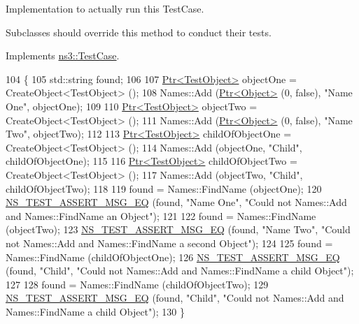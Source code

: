 Implementation to actually run this Test\+Case. 

Subclasses should override this method to conduct their tests. 

Implements \hyperlink{classns3_1_1TestCase_a8ff74680cf017ed42011e4be51917a24}{ns3\+::\+Test\+Case}.


\begin{DoxyCode}
104 \{
105   std::string found;
106 
107   \hyperlink{classns3_1_1Ptr}{Ptr<TestObject>} objectOne = CreateObject<TestObject> ();
108   Names::Add (\hyperlink{classns3_1_1Ptr}{Ptr<Object>} (0, \textcolor{keyword}{false}), \textcolor{stringliteral}{"Name One"}, objectOne);
109 
110   \hyperlink{classns3_1_1Ptr}{Ptr<TestObject>} objectTwo = CreateObject<TestObject> ();
111   Names::Add (\hyperlink{classns3_1_1Ptr}{Ptr<Object>} (0, \textcolor{keyword}{false}), \textcolor{stringliteral}{"Name Two"}, objectTwo);
112 
113   \hyperlink{classns3_1_1Ptr}{Ptr<TestObject>} childOfObjectOne = CreateObject<TestObject> ();
114   Names::Add (objectOne, \textcolor{stringliteral}{"Child"}, childOfObjectOne);
115 
116   \hyperlink{classns3_1_1Ptr}{Ptr<TestObject>} childOfObjectTwo = CreateObject<TestObject> ();
117   Names::Add (objectTwo, \textcolor{stringliteral}{"Child"}, childOfObjectTwo);
118 
119   found = Names::FindName (objectOne);
120   \hyperlink{group__testing_ga2a9d78cffb3db8e867c35fff0b698cf5}{NS\_TEST\_ASSERT\_MSG\_EQ} (found, \textcolor{stringliteral}{"Name One"}, \textcolor{stringliteral}{"Could not Names::Add and Names::FindName
       an Object"});
121 
122   found = Names::FindName (objectTwo);
123   \hyperlink{group__testing_ga2a9d78cffb3db8e867c35fff0b698cf5}{NS\_TEST\_ASSERT\_MSG\_EQ} (found, \textcolor{stringliteral}{"Name Two"}, \textcolor{stringliteral}{"Could not Names::Add and Names::FindName
       a second Object"});
124 
125   found = Names::FindName (childOfObjectOne);
126   \hyperlink{group__testing_ga2a9d78cffb3db8e867c35fff0b698cf5}{NS\_TEST\_ASSERT\_MSG\_EQ} (found, \textcolor{stringliteral}{"Child"}, \textcolor{stringliteral}{"Could not Names::Add and Names::FindName a
       child Object"});
127 
128   found = Names::FindName (childOfObjectTwo);
129   \hyperlink{group__testing_ga2a9d78cffb3db8e867c35fff0b698cf5}{NS\_TEST\_ASSERT\_MSG\_EQ} (found, \textcolor{stringliteral}{"Child"}, \textcolor{stringliteral}{"Could not Names::Add and Names::FindName a
       child Object"});
130 \}
\end{DoxyCode}
